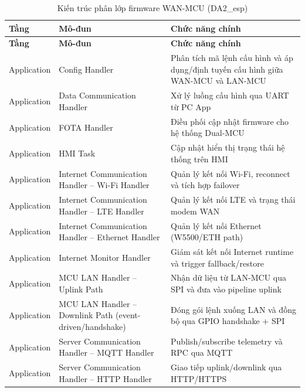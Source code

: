             \begin{longtable}{|p{}|p{}|p{}|}
                \caption{Kiến trúc phân lớp firmware WAN-MCU (DA2\_esp)}
                \label{tab:wan_mcu_arch} \\
                \hline
                \textbf{Tầng} & \textbf{Mô-đun} & \textbf{Chức năng chính} \\ \hline
                \endfirsthead
                \hline
                \textbf{Tầng} & \textbf{Mô-đun} & \textbf{Chức năng chính} \\ \hline
                \endhead
                Application & Config Handler & Phân tích mã lệnh cấu hình và áp dụng/định tuyến cấu hình giữa WAN-MCU và LAN-MCU \\ \hline
                Application & Data Communication Handler & Xử lý luồng cấu hình qua UART từ PC App \\ \hline
                Application & FOTA Handler & Điều phối cập nhật firmware cho hệ thống Dual-MCU \\ \hline
                Application & HMI Task & Cập nhật hiển thị trạng thái hệ thống trên HMI \\ \hline
                Application & Internet Communication Handler -- Wi-Fi Handler & Quản lý kết nối Wi-Fi, reconnect và tích hợp failover \\ \hline
                Application & Internet Communication Handler -- LTE Handler & Quản lý kết nối LTE và trạng thái modem WAN \\ \hline
                Application & Internet Communication Handler -- Ethernet Handler & Quản lý kết nối Ethernet (W5500/ETH path) \\ \hline
                Application & Internet Monitor Handler & Giám sát kết nối Internet runtime và trigger fallback/restore \\ \hline
                Application & MCU LAN Handler -- Uplink Path & Nhận dữ liệu từ LAN-MCU qua SPI và đưa vào pipeline uplink \\ \hline
                Application & MCU LAN Handler -- Downlink Path (event-driven/handshake) & Đóng gói lệnh xuống LAN và đồng bộ qua GPIO handshake + SPI \\ \hline
                Application & Server Communication Handler -- MQTT Handler & Publish/subscribe telemetry và RPC qua MQTT \\ \hline
                Application & Server Communication Handler -- HTTP Handler & Giao tiếp uplink/downlink qua HTTP/HTTPS \\ \hline

\end{longtable}
